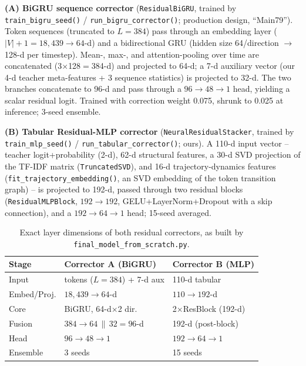 \documentclass[10pt,twocolumn]{article}
\begin{document}
\textbf{(A) BiGRU sequence corrector} (\texttt{ResidualBiGRU}, trained by \texttt{train\_bigru\_seed()} / \texttt{run\_bigru\_corrector()}; production design, ``Main79''). Token sequences (truncated to $L{=}384$) pass through an embedding layer ($|V|{+}1{=}18{,}439 \rightarrow 64$-d) and a bidirectional GRU (hidden size 64/direction $\rightarrow$ 128-d per timestep). Mean-, max-, and attention-pooling over time are concatenated (3$\times$128$=$384-d) and projected to 64-d; a 7-d auxiliary vector (our 4-d teacher meta-features + 3 sequence statistics) is projected to 32-d. The two branches concatenate to 96-d and pass through a $96{\to}48{\to}1$ head, yielding a scalar residual logit. Trained with correction weight 0.075, shrunk to 0.025 at inference; 3-seed ensemble.

\textbf{(B) Tabular Residual-MLP corrector} (\texttt{NeuralResidualStacker}, trained by \texttt{train\_mlp\_seed()} / \texttt{run\_tabular\_corrector()}; ours). A 110-d input vector -- teacher logit+probability (2-d), 62-d structural features, a 30-d SVD projection of the TF-IDF matrix (\texttt{TruncatedSVD}), and 16-d trajectory-dynamics features (\texttt{fit\_trajectory\_embedding()}, an SVD embedding of the token transition graph) -- is projected to 192-d, passed through two residual blocks (\texttt{ResidualMLPBlock}, $192{\to}192$, GELU+LayerNorm+Dropout with a skip connection), and a $192{\to}64{\to}1$ head; 15-seed averaged.

\begin{table}[!htb]
\centering\scriptsize
\begin{tabular}{@{}lll@{}}
\toprule
Stage & Corrector A (BiGRU) & Corrector B (MLP) \\
\midrule
Input & tokens ($L{=}384$) + 7-d aux & 110-d tabular \\
Embed/Proj. & $18{,}439 \!\to\! 64$-d & $110 \!\to\! 192$-d \\
Core & BiGRU, 64-d$\times$2 dir. & 2$\times$ResBlock (192-d) \\
Fusion & $384\!\to\!64 \,\|\, 32 = 96$-d & 192-d (post-block) \\
Head & $96\!\to\!48\!\to\!1$ & $192\!\to\!64\!\to\!1$ \\
Ensemble & 3 seeds & 15 seeds \\
\bottomrule
\end{tabular}
\caption{Exact layer dimensions of both residual correctors, as built by \texttt{final\_model\_from\_scratch.py}.}
\label{tab:archdims}
\end{table}
\end{document}
